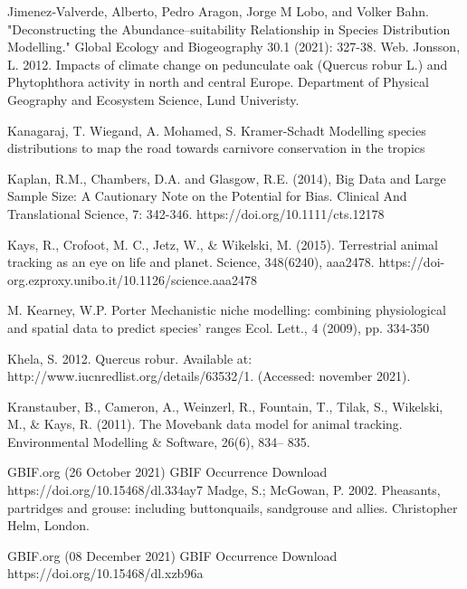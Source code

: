 \documentclass[12pt,a4paper]{article}
\begin{document}
\begin{thebibliography}{999}
Jimenez‐Valverde, Alberto, Pedro Aragon, Jorge M Lobo, and Volker Bahn. "Deconstructing the Abundance–suitability Relationship in Species Distribution Modelling." Global Ecology and Biogeography 30.1 (2021): 327-38. Web.
Jonsson, L. 2012. Impacts of climate change on pedunculate oak (Quercus robur L.) and Phytophthora activity in north and central Europe. Department of Physical Geography and Ecosystem Science, Lund Univeristy.

 Kanagaraj, T. Wiegand, A. Mohamed, S. Kramer-Schadt
Modelling species distributions to map the road towards carnivore conservation in the tropics

Kaplan, R.M., Chambers, D.A. and Glasgow, R.E. (2014), Big Data and Large Sample Size: A Cautionary Note on the Potential for Bias. Clinical And Translational Science, 7: 342-346. https://doi.org/10.1111/cts.12178

Kays, R., Crofoot, M. C., Jetz, W., \& Wikelski, M. (2015). Terrestrial animal tracking as an eye on life and planet. Science, 348(6240), aaa2478. https://doi-org.ezproxy.unibo.it/10.1126/science.aaa2478



M. Kearney, W.P. Porter
Mechanistic niche modelling: combining physiological and spatial data to predict species’ ranges
Ecol. Lett., 4 (2009), pp. 334-350

Khela, S. 2012. Quercus robur. Available at: http://www.iucnredlist.org/details/63532/1. (Accessed: november 2021).


Kranstauber, B., Cameron, A., Weinzerl, R., Fountain, T., Tilak, S., Wikelski, M., \& Kays, R. (2011). The Movebank data model for animal tracking. Environmental Modelling & Software, 26(6), 834– 835.

GBIF.org (26 October 2021) GBIF Occurrence Download  https://doi.org/10.15468/dl.334ay7
Madge, S.; McGowan, P. 2002. Pheasants, partridges and grouse: including buttonquails, sandgrouse and allies. Christopher Helm, London.

GBIF.org (08 December 2021) GBIF Occurrence Download  https://doi.org/10.15468/dl.xzb96a


\end{thebibliography}
\end{document}

